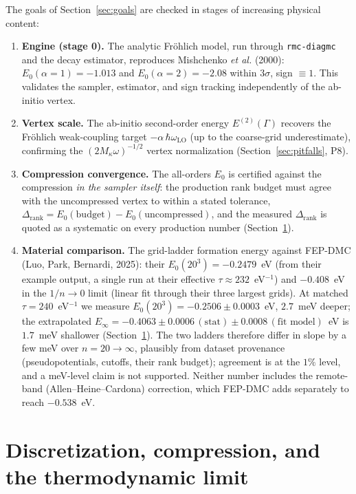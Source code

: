 \documentclass[11pt]{article}
\begin{document}
The goals of Section~\ref{sec:goals} are checked in stages of increasing physical content:
\begin{enumerate}
  \item \textbf{Engine (stage 0).} The analytic Fr\"ohlich model, run through
    \texttt{rmc-diagmc} and the decay estimator, reproduces Mishchenko \emph{et al.} (2000):
    $E_{0}(\alpha{=}1)=-1.013$ and $E_{0}(\alpha{=}2)=-2.08$ within $3\sigma$, sign
    $\equiv1$. This validates the sampler, estimator, and sign tracking independently of the
    ab-initio vertex.
  \item \textbf{Vertex scale.} The ab-initio second-order energy $E^{(2)}(\Gamma)$ recovers
    the Fr\"ohlich weak-coupling target $-\alpha\,\hbar\omega_{\mathrm{LO}}$ (up to the
    coarse-grid underestimate), confirming the $(2M_{\kappa}\omega)^{-1/2}$ vertex
    normalization (Section~\ref{sec:pitfalls}, P8).
  \item \textbf{Compression convergence.} The all-orders $E_{0}$ is certified against the
    compression \emph{in the sampler itself}: the production rank budget must agree with the
    uncompressed vertex to within a stated tolerance,
    $\Delta_{\mathrm{rank}}=E_{0}(\text{budget})-E_{0}(\text{uncompressed})$, and the measured
    $\Delta_{\mathrm{rank}}$ is quoted as a systematic on every production number
    (Section~\ref{sec:discretization}).
  \item \textbf{Material comparison.} The grid-ladder formation energy against FEP-DMC (Luo, Park, Bernardi, 2025): their $E_{0}(20^{3})=-0.2479$~eV (from their example output, a single run at their effective $\tau\approx232$~eV$^{-1}$) and $-0.408$~eV in the $1/n\to0$ limit (linear fit through their three largest grids). At matched $\tau=240$~eV$^{-1}$ we measure $E_{0}(20^{3})=-0.2506\pm0.0003$~eV, $2.7$~meV deeper; the extrapolated $E_{\infty}=-0.4063\pm0.0006\,(\text{stat})\pm0.0008\,(\text{fit model})$~eV is $1.7$~meV shallower (Section~\ref{sec:discretization}). The two ladders therefore differ in slope by a few meV over $n=20\to\infty$, plausibly from dataset provenance (pseudopotentials, cutoffs, their rank budget); agreement is at the $1\%$ level, and a meV-level claim is not supported. Neither number includes the remote-band (Allen--Heine--Cardona) correction, which FEP-DMC adds separately to reach $-0.538$~eV.
\end{enumerate}

\section{Discretization, compression, and the thermodynamic limit}
\label{sec:discretization}
\end{document}
